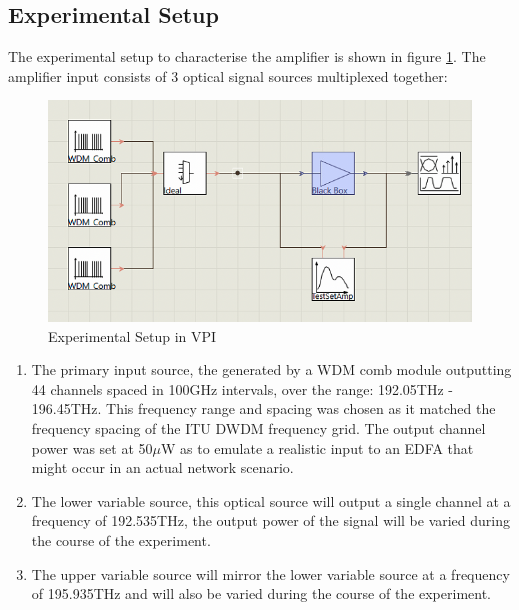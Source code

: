 \subsection{Experimental Setup}
The experimental setup to characterise the amplifier is shown in figure \ref{fig:tw_amp_char}.
The amplifier input consists of 3 optical signal sources multiplexed together:

\begin{figure}
    \centering
    \includegraphics[width=\linewidth]{images/technical_work/section_1_characterisation/amp_char_ex_setup.png}
    \caption{Experimental Setup in VPI}
    \label{fig:tw_amp_char}
\end{figure}


\begin{enumerate}
    \item The primary input source, the generated by a WDM comb module outputting 44 channels spaced in 100GHz intervals, over the range: 192.05THz - 196.45THz. This frequency range and spacing was chosen as it matched the frequency spacing of the ITU DWDM frequency grid. The output channel power was set at 50$\mu$W as to emulate a realistic input to an EDFA that might occur in an actual network scenario. \\
    
    \item The lower variable source, this optical source will output a single channel at a frequency of 192.535THz, the output power of the signal will be varied during the course of the experiment.\\
    
    \item The upper variable source will mirror the lower variable source at a frequency of 195.935THz and will also be varied during the course of the experiment.  
\end{enumerate}


